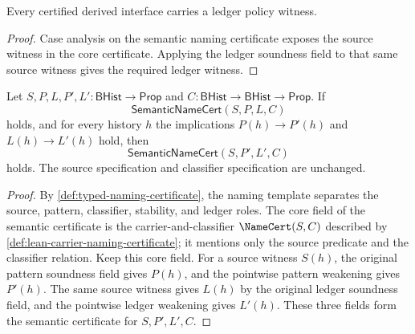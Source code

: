 \begin{principle}
\label{prin:limit-like-interfaces-derived}
Every certified derived interface carries a ledger policy witness.
\end{principle}
\begin{proof}
Case analysis on the semantic naming certificate exposes the source witness in the core certificate. Applying the ledger soundness field to that same source witness gives the required ledger witness.
\end{proof}

\begin{theorem}
\label{thm:semantic-namecert-presentation-weakening}
Let \(S,P,L,P',L'\colon \mathsf{BHist}\to\mathsf{Prop}\) and
\(C\colon \mathsf{BHist}\to\mathsf{BHist}\to\mathsf{Prop}\). If
$$
\mathsf{SemanticNameCert}(S,P,L,C)
$$
holds, and for every history \(h\) the implications \(P(h)\to P'(h)\) and
\(L(h)\to L'(h)\) hold, then
$$
\mathsf{SemanticNameCert}(S,P',L',C)
$$
holds. The source specification and classifier specification are unchanged.
\end{theorem}
\begin{proof}
By \autoref{def:typed-naming-certificate}, the naming template separates the
source, pattern, classifier, stability, and ledger roles. The core field of the
semantic certificate is the carrier-and-classifier \(\NameCert(S,C)\) described
by \autoref{def:lean-carrier-naming-certificate}; it mentions only the source
predicate and the classifier relation. Keep this core field. For a source
witness \(S(h)\), the original pattern soundness field gives \(P(h)\), and the
pointwise pattern weakening gives \(P'(h)\). The same source witness gives
\(L(h)\) by the original ledger soundness field, and the pointwise ledger
weakening gives \(L'(h)\). These three fields form the semantic certificate for
\(S,P',L',C\).
\end{proof}
